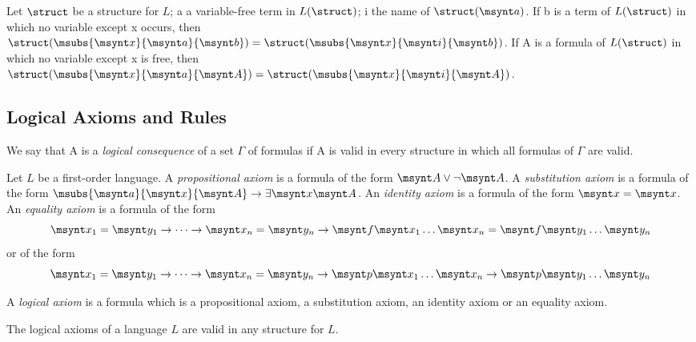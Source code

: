 \begin{lemma}
	Let $\struct$ be a structure for $L$; \synt a a variable-free term in
	$L(\struct)$; \synt i the name of $\struct(\msynt a)$. If \synt b is a term 
	of $L(\struct)$ in which no variable except \synt x occurs, then
	$\struct(\msubs{\msynt x}{\msynt a}{\msynt b}) = \struct(\msubs{\msynt x}{\msynt i}{\msynt b})$.
	If \synt A is a formula of $L(\struct)$ in which no variable except \synt x
	is free, then
	$\struct(\msubs{\msynt x}{\msynt a}{\msynt A}) = \struct(\msubs{\msynt x}{\msynt i}{\msynt A})$.
\end{lemma}

\subsection{Logical Axioms and Rules}

\begin{definition}
	We say that \synt A is a \emph{logical consequence} of a set $\Gamma$ of formulas 
	if \synt A is valid in every structure in which all formulas of $\Gamma$ are valid.
\end{definition}

\begin{definition}
	Let $L$ be a first-order language. A \emph{propositional axiom} is a formula
	of the form $\msynt A \lor \lnot \msynt A$. A \emph{substitution axiom} is a
	formula of the form $\msubs{\msynt a}{\msynt x}{\msynt A}\to \exists \msynt x \msynt A$.
	An \emph{identity axiom} is a formula of the form $\msynt x = \msynt x$. An
	\emph{equality axiom} is a formula of the form
	\[\msynt x_1 = \msynt y_1\to\dots\to\msynt x_n = \msynt y_n\to
	\msynt f\msynt x_1\dots\msynt x_n=\msynt f\msynt y_1\dots\msynt y_n\]
	or of the form
	\[\msynt x_1 = \msynt y_1\to\dots\to\msynt x_n = \msynt y_n\to
	\msynt p\msynt x_1\dots\msynt x_n\to\msynt p\msynt y_1\dots\msynt y_n\]

	A \emph{logical axiom} is a formula which is a propositional axiom, a 
	substitution axiom, an identity axiom or an equality axiom.
\end{definition}

\begin{fact}
	The logical axioms of a language $L$ are valid in any structure for $L$.
\end{fact}

